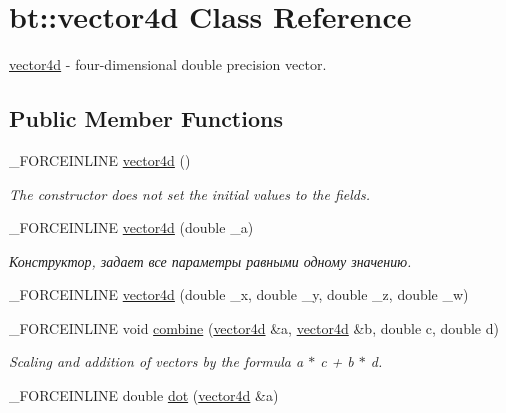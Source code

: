 \hypertarget{classbt_1_1vector4d}{\section{bt\-:\-:vector4d Class Reference}
\label{classbt_1_1vector4d}
}


\hyperlink{classbt_1_1vector4d}{vector4d} -\/ four-\/dimensional double precision vector.  


\subsection*{Public Member Functions}
\begin{DoxyCompactItemize}
\item 
\hypertarget{classbt_1_1vector4d_ace5b25ec8e5cde4adc4aeb34def03b7d}{\-\_\-\-F\-O\-R\-C\-E\-I\-N\-L\-I\-N\-E \hyperlink{classbt_1_1vector4d_ace5b25ec8e5cde4adc4aeb34def03b7d}{vector4d} ()}\label{classbt_1_1vector4d_ace5b25ec8e5cde4adc4aeb34def03b7d}

\begin{DoxyCompactList}\small\item\em The constructor does not set the initial values to the fields. \end{DoxyCompactList}\item 
\hypertarget{classbt_1_1vector4d_af8ea55cc63a2219ed7b0300a03e9c382}{\-\_\-\-F\-O\-R\-C\-E\-I\-N\-L\-I\-N\-E \hyperlink{classbt_1_1vector4d_af8ea55cc63a2219ed7b0300a03e9c382}{vector4d} (double \-\_\-a)}\label{classbt_1_1vector4d_af8ea55cc63a2219ed7b0300a03e9c382}

\begin{DoxyCompactList}\small\item\em Конструктор, задает все параметры равными одному значению. \end{DoxyCompactList}\item 
\-\_\-\-F\-O\-R\-C\-E\-I\-N\-L\-I\-N\-E \hyperlink{classbt_1_1vector4d_ac74da95033f98e510744861301b77055}{vector4d} (double \-\_\-x, double \-\_\-y, double \-\_\-z, double \-\_\-w)
\item 
\hypertarget{classbt_1_1vector4d_a0c3a14dc0c33344b82b05375c821a259}{\-\_\-\-F\-O\-R\-C\-E\-I\-N\-L\-I\-N\-E void \hyperlink{classbt_1_1vector4d_a0c3a14dc0c33344b82b05375c821a259}{combine} (\hyperlink{classbt_1_1vector4d}{vector4d} \&a, \hyperlink{classbt_1_1vector4d}{vector4d} \&b, double c, double d)}\label{classbt_1_1vector4d_a0c3a14dc0c33344b82b05375c821a259}

\begin{DoxyCompactList}\small\item\em Scaling and addition of vectors by the formula a $\ast$ c + b $\ast$ d. \end{DoxyCompactList}\item 
\hypertarget{classbt_1_1vector4d_ae7dad067e7f1ec38d07e16b5f0fb1e75}{\-\_\-\-F\-O\-R\-C\-E\-I\-N\-L\-I\-N\-E double \hyperlink{classbt_1_1vector4d_ae7dad067e7f1ec38d07e16b5f0fb1e75}{dot} (\hyperlink{classbt_1_1vector4d}{vector4d} \&a)}\label{classbt_1_1vector4d_ae7dad067e7f1ec38d07e16b5f0fb1e75}


\end{DoxyCompactItemize}
